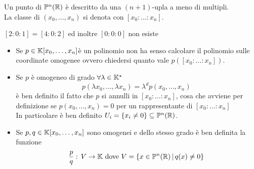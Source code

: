 \begin{defn}\bianco
 Un punto di $\mathbb{P}^n (\mathbb{R})$ \`e descritto da una $(n+1)$-upla a meno di multipli.\\
 La classe di $(x_0, \dots, x_n)$ si denota con $[x_0:\dots : x_n ]$.

\begin{oss}$[2:0:1]=[4:0:2]$ ed inoltre $[0:0:0]$ non esiste
\end{oss}
\end{defn}
\begin{fatti}\bbianco
\begin{itemize} \item Se $p\in \mathbb{K}[x_0, \dots, x_n]$\`e un polinomio non ha senso calcolare il polinomio sulle coordinate omogenee ovvero chiedersi quanto vale $p([x_0:\dots :x_n])$.
\item
Se $p$ \`e omogeneo di grado $\forall \lambda\in \mathbb{K}^\star $ 
$$ p( \lambda x_0, \dots, \lambda x_n) = \lambda^d p(x_0, \dots, x_n)$$
\`e ben definito il fatto che $p$ si annulli in $[x_0: \dots : x_n]$, cosa che avviene per definizione se $p(x_0, \dots, x_n)=0$ per un rappresentante di $[x_0:\dots : x_n]$\\
In particolare \`e ben definito $U_i=\{ x_i \neq 0 \} \subseteq \mathbb{P}^n(\mathbb{R})$.
\item Se $p,q\in\mathbb{K}[x_0, \dots, x_n]$ sono omogenei e dello stesso grado \`e ben definita la funzione 
$$ \frac{p}{q}:\, V \to \mathbb{K}  \text{ dove } V =\{ x \in \mathbb{P}^n(\mathbb{R})\, \vert \, q(x) \neq 0 \}$$ 
\end{itemize}
\end{fatti}

